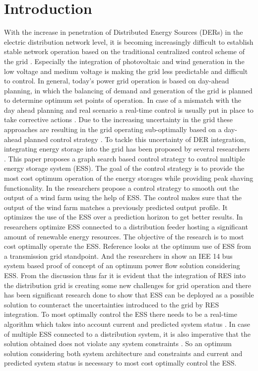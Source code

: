 \section{Introduction} \label{sec:intro}
With the increase in penetration of Distributed Energy Sources (DERs) in the electric distribution network level, it is becoming increasingly difficult to establish stable network operation based on the traditional centralized control scheme of the grid \cite{WHY}. Especially the integration of photovoltaic and wind generation in the low voltage and medium voltage is making the grid less predictable and difficult to control. In general, today's power grid operation is based on day-ahead planning, in which the balancing of demand and generation of the grid is planned to determine optimum set points of operation. In case of a mismatch with the day ahead planning and real scenario a real-time control is usually put in place to take corrective actions \cite{WHY2}. Due to the increasing uncertainty in the grid these approaches are resulting in the grid operating sub-optimally based on a day-ahead planned control strategy \cite{WHY2}. To tackle this uncertainty of DER integration, integrating energy storage into the grid has been proposed by several researchers \cite{WHY2,ESI1,ES2,ES3}. 
This paper proposes a graph search based control strategy to control multiple energy storage system (ESS). The goal of the control strategy is to provide the most cost optimum operation of the energy storages while providing peak shaving functionality. In \cite{IM1} the researchers propose a control strategy to smooth out the output of a wind farm using the help of ESS. The control makes sure that the output of the wind farm matches a previously predicted output profile. It optimizes the use of the ESS over a prediction horizon to get better results. In \cite{IM2} researchers optimize ESS connected to a distribution feeder hosting a significant amount of renewable energy resources. The objective of the research is to most cost optimally operate the ESS. Reference \cite{IM3} looks at the optimum use of ESS from a transmission grid standpoint. And the researchers in \cite{IM4} show an IEE 14 bus system based proof of concept of an optimum power flow solution considering ESS. From the discussion thus far it is evident that the integration of RES into the distribution grid is creating some new challenges for grid operation and there has been significant research done to show that ESS can be deployed as a possible solution to counteract the uncertainties introduced to the grid by RES integration. To most optimally control the ESS there needs to be a real-time algorithm which takes into account current and predicted system status \cite{gupta_francis_ospina_newaz_2018}. In case of multiple ESS connected to a distribution system, it is also imperative that the solution obtained does not violate any system constraints \cite{rt4}. So an optimum solution considering both system architecture and constraints and current and predicted system status is necessary to most cost optimally control the ESS.